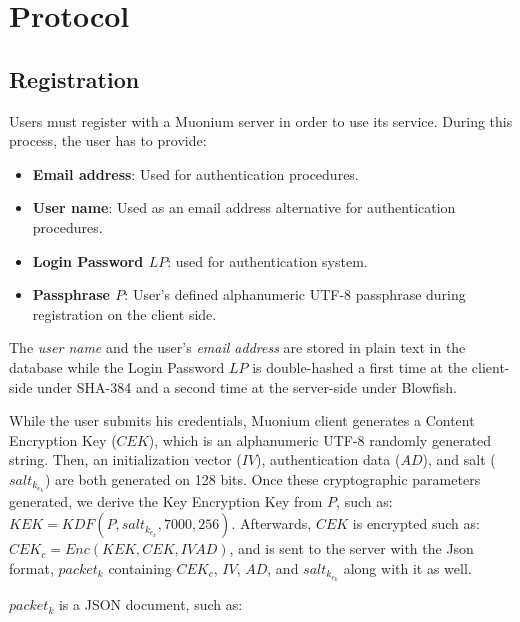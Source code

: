 \documentclass[a4paper,10pt]{article}
\begin{document}
\section{Protocol}
\subsection{Registration}
Users must register with a Muonium server in order to use its service. During this process, the user has to provide:

\begin{itemize}
    \item \textbf{Email address}: Used for authentication procedures.
    \item \textbf{User name}: Used as an email address alternative for authentication procedures.
    \item \textbf{Login Password $LP$}: used for authentication system.
    \item \textbf{Passphrase $P$}:
		User's defined alphanumeric UTF-8 passphrase during registration on the client side.
\end{itemize}

The \emph{user name} and the user's \emph{email address} are stored in plain text in the database while the Login
Password $LP$ is double-hashed a first time at the client-side under SHA-384 and a second time at the server-side
under Blowfish.

\vspace{5mm}

While the user submits his credentials, Muonium client generates a Content Encryption Key ($CEK$),
which is an alphanumeric UTF-8 randomly generated string.
Then, an initialization vector ($IV$), authentication data ($AD$), and salt ($salt_k_e_k$) are both generated on 128 bits.
Once these cryptographic parameters generated, we derive the Key Encryption Key from $P$, such as: $KEK=KDF(P, salt_k_e_k, 7000, 256)$.
Afterwards, $CEK$ is encrypted such as: $CEK_c=Enc(KEK, CEK, IV AD)$, and is sent to the server with the Json format, $packet_k$ containing
$CEK_c$, $IV$, $AD$, and $salt_k_e_k$ along with it as well.

\vspace{5mm}

$packet_k$ is a JSON document, such as:

\end{document}
